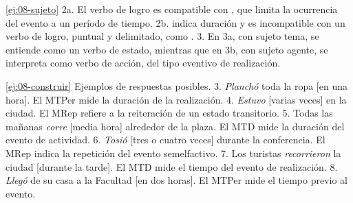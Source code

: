 \begin{solucion}{\ref{ej:08-sujeto}}
2a. El verbo de logro  es compatible con , que limita la ocurrencia del evento a un período de tiempo. 2b.
 indica duración y es incompatible con un verbo de
logro, puntual y delimitado, como . 3. En 3a, con sujeto tema,
 se entiende como un verbo de estado, mientras que en 3b, con
sujeto agente, se interpreta como verbo de acción, del tipo eventivo de
realización.
\end{solucion}

\begin{solucion}{\ref{ej:08-construir}}
Ejemplos de respuestas posibles. 3. \textit{Planchó} toda la ropa [en una hora].
El MTPer mide la duración de la realización. 4. \textit{Estuvo} [varias veces] en
la ciudad. El MRep refiere a la reiteración de un estado transitorio. 5. Todas
las mañanas \textit{corre} [media hora] alrededor de la plaza. El MTD mide la
duración del evento de actividad. 6. \textit{Tosió} [tres o cuatro veces] durante
la conferencia. El MRep indica la repetición del evento semelfactivo. 7. Los
turistas \textit{recorrieron} la ciudad [durante la tarde]. El MTD mide el
tiempo del evento de realización. 8. \textit{Llegó} de su casa a la Facultad [en
dos horas]. El MTPer mide el tiempo previo al evento.
\end{solucion}

